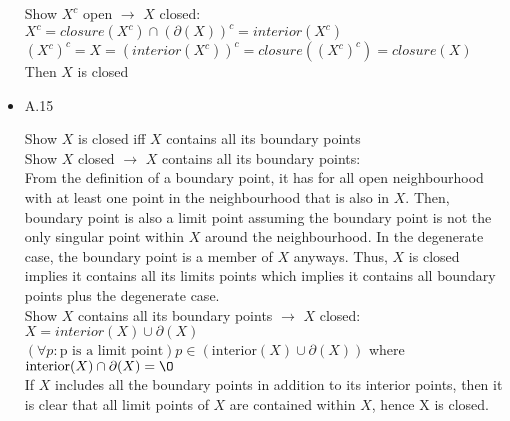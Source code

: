 \documentclass[12pt,letter]{article}
\begin{document}
\begin{itemize}
  Show $X^c$ open $\rightarrow$ $X$ closed:\\
  $X^c=closure(X^c) \cap (\partial(X))^c=interior(X^c)$\\
  $(X^c)^c=X=(interior(X^c))^c=closure((X^c)^c)=closure(X)$\\
  Then $X$ is closed\\  

  \pagebreak
  
\item A.15
  
  Show $X$ is closed iff $X$ contains all its boundary points\\
  
  Show $X$ closed $\rightarrow$ $X$ contains all its boundary points:\\
  From the definition of a boundary point, it has for all open neighbourhood with at least one point in the neighbourhood that is also in $X$. Then, boundary point is also a limit point assuming the boundary point is not the only singular point within $X$ around the neighbourhood. In the degenerate case, the boundary point is a member of $X$ anyways. Thus, $X$ is closed implies it contains all its limits points which implies it contains all boundary points plus the degenerate case.
  \\
  
  Show $X$ contains all its boundary points $\rightarrow$ $X$ closed:\\
  $X=interior(X)\cup\partial(X)$\\
  $(\forall p: \text{p is a limit point}) p \in (\text{interior}(X) \cup \partial(X))$ where $\text{interior}(X) \cap \partial(X) = \O$\\
  If $X$ includes all the boundary points in addition to its interior points, then it is clear that all limit points of $X$ are contained within $X$, hence X is closed.
  

\end{itemize}
\end{document}
